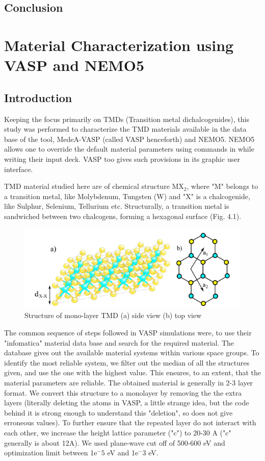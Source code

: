 \documentclass[microe]{ritthesis}
\begin{document}
\section{Conclusion}
\chapter{Material Characterization using VASP and NEMO5}
\section{Introduction}
Keeping the focus primarily on TMDs (Transition metal dichalcogenides), this study was performed to characterize the TMD materials available in the data base of the tool, MedeA-VASP (called VASP henceforth) and NEMO5. NEMO5 allows one to override the default material parameters using commands in while writing their input deck. VASP too gives such provisions in its graphic user interface. 

TMD material studied here are of chemical structure MX$_2$, where "M" belongs to a transition metal, like Molybdenum, Tungsten (W) and "X" is a chalcogenide, like Sulphur, Selenium, Tellurium etc. Structurally, a transition metal is sandwiched between two chalcogens, forming a hexagonal surface (Fig. 4.1)\cite{Andor}.
\begin{figure}
    \centering
    \includegraphics{tmdStructure.PNG}
    \caption{Structure of mono-layer TMD (a) side view (b) top view\cite{Andor}}
    \label{fig:my_label}
\end{figure}

The common sequence of steps followed in VASP simulations were, to use their "infomatica" material data base and search for the required material. The database gives out the available material systems within various space groups. To identify the most reliable system, we filter out the median of all the structures given, and use the one with the highest value. This ensures, to an extent, that the material parameters are reliable. The obtained material is generally in 2-3 layer format. We convert this structure to a monolayer by removing the the extra layers (literally deleting the atoms in VASP, a little strange idea, but the code behind it is strong enough to understand this "deletion", so does not give erroneous values). To further ensure that the repeated layer do not interact with each other, we increase the height lattice parameter ("c") to 20-30 A ("c" generally is about 12A). We used plane-wave cut off of 500-600 eV and optimization limit between 1e$^-5$ eV and 1e$^-3$ eV. 
\end{document}
